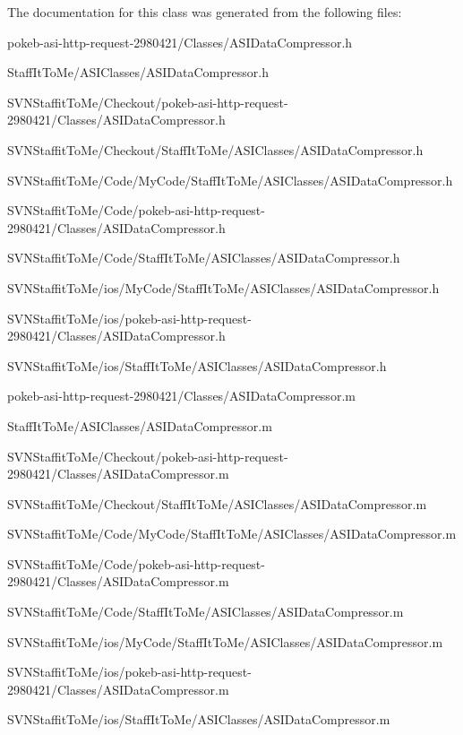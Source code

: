 \-The documentation for this class was generated from the following files\-:\begin{DoxyCompactItemize}
\item 
pokeb-\/asi-\/http-\/request-\/2980421/\-Classes/\-A\-S\-I\-Data\-Compressor.\-h\item 
\-Staff\-It\-To\-Me/\-A\-S\-I\-Classes/\-A\-S\-I\-Data\-Compressor.\-h\item 
\-S\-V\-N\-Staffit\-To\-Me/\-Checkout/pokeb-\/asi-\/http-\/request-\/2980421/\-Classes/\-A\-S\-I\-Data\-Compressor.\-h\item 
\-S\-V\-N\-Staffit\-To\-Me/\-Checkout/\-Staff\-It\-To\-Me/\-A\-S\-I\-Classes/\-A\-S\-I\-Data\-Compressor.\-h\item 
\-S\-V\-N\-Staffit\-To\-Me/\-Code/\-My\-Code/\-Staff\-It\-To\-Me/\-A\-S\-I\-Classes/\-A\-S\-I\-Data\-Compressor.\-h\item 
\-S\-V\-N\-Staffit\-To\-Me/\-Code/pokeb-\/asi-\/http-\/request-\/2980421/\-Classes/\-A\-S\-I\-Data\-Compressor.\-h\item 
\-S\-V\-N\-Staffit\-To\-Me/\-Code/\-Staff\-It\-To\-Me/\-A\-S\-I\-Classes/\-A\-S\-I\-Data\-Compressor.\-h\item 
\-S\-V\-N\-Staffit\-To\-Me/ios/\-My\-Code/\-Staff\-It\-To\-Me/\-A\-S\-I\-Classes/\-A\-S\-I\-Data\-Compressor.\-h\item 
\-S\-V\-N\-Staffit\-To\-Me/ios/pokeb-\/asi-\/http-\/request-\/2980421/\-Classes/\-A\-S\-I\-Data\-Compressor.\-h\item 
\-S\-V\-N\-Staffit\-To\-Me/ios/\-Staff\-It\-To\-Me/\-A\-S\-I\-Classes/\-A\-S\-I\-Data\-Compressor.\-h\item 
pokeb-\/asi-\/http-\/request-\/2980421/\-Classes/\-A\-S\-I\-Data\-Compressor.\-m\item 
\-Staff\-It\-To\-Me/\-A\-S\-I\-Classes/\-A\-S\-I\-Data\-Compressor.\-m\item 
\-S\-V\-N\-Staffit\-To\-Me/\-Checkout/pokeb-\/asi-\/http-\/request-\/2980421/\-Classes/\-A\-S\-I\-Data\-Compressor.\-m\item 
\-S\-V\-N\-Staffit\-To\-Me/\-Checkout/\-Staff\-It\-To\-Me/\-A\-S\-I\-Classes/\-A\-S\-I\-Data\-Compressor.\-m\item 
\-S\-V\-N\-Staffit\-To\-Me/\-Code/\-My\-Code/\-Staff\-It\-To\-Me/\-A\-S\-I\-Classes/\-A\-S\-I\-Data\-Compressor.\-m\item 
\-S\-V\-N\-Staffit\-To\-Me/\-Code/pokeb-\/asi-\/http-\/request-\/2980421/\-Classes/\-A\-S\-I\-Data\-Compressor.\-m\item 
\-S\-V\-N\-Staffit\-To\-Me/\-Code/\-Staff\-It\-To\-Me/\-A\-S\-I\-Classes/\-A\-S\-I\-Data\-Compressor.\-m\item 
\-S\-V\-N\-Staffit\-To\-Me/ios/\-My\-Code/\-Staff\-It\-To\-Me/\-A\-S\-I\-Classes/\-A\-S\-I\-Data\-Compressor.\-m\item 
\-S\-V\-N\-Staffit\-To\-Me/ios/pokeb-\/asi-\/http-\/request-\/2980421/\-Classes/\-A\-S\-I\-Data\-Compressor.\-m\item 
\-S\-V\-N\-Staffit\-To\-Me/ios/\-Staff\-It\-To\-Me/\-A\-S\-I\-Classes/\-A\-S\-I\-Data\-Compressor.\-m\end{DoxyCompactItemize}
